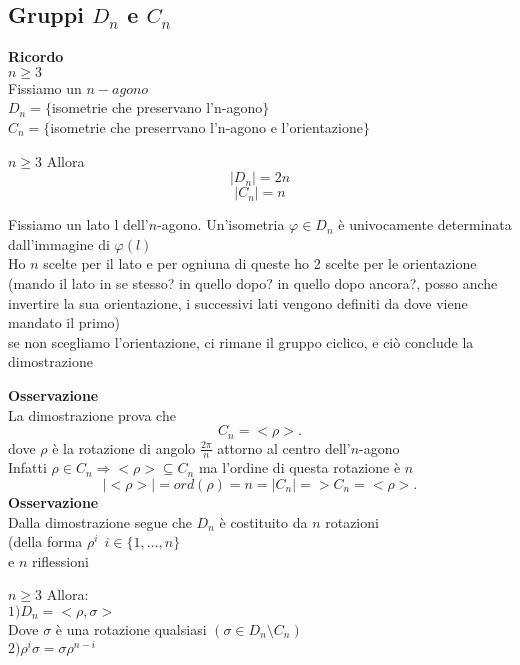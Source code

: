 \documentclass[12px]{article}
\begin{document}
{ \subsection{Gruppi $D_n$ e $C_n$}
  \textbf{Ricordo}\\
  $n\geq 3$\\
  Fissiamo un  $n-agono$ \\
  $D_n = \lbrace$isometrie che preservano l'n-agono$\rbrace$\\
   $C_n  = \lbrace$isometrie che preserrvano l'n-agono e l'orientazione$\rbrace$\\
 \begin{teo}
 	$n\geq 3$ Allora\\
	\[|D_n| = 2n\]
\[|C_n| = n\]
 \end{teo}
 \begin{dimo}
	 Fissiamo un lato l dell'$n$-agono. Un'isometria $ \varphi\in D_n$ è univocamente determinata dall'immagine di $ \varphi(l)$\\
	 Ho $n$ scelte per il lato e per ogniuna di queste ho 2 scelte per le orientazione (mando il lato in se stesso? in quello dopo? in quello dopo ancora?, posso anche invertire la sua orientazione, i successivi lati vengono definiti da dove viene mandato il primo)\\
	 se non scegliamo l'orientazione, ci rimane il gruppo ciclico, e ciò conclude la dimostrazione
 \end{dimo}
 \textbf{Osservazione}\\
 La dimostrazione prova che
 \[
  C_n = <\rho>
 .\]
 dove $\rho$ è la rotazione di angolo $\frac {2\pi}{n}$ attorno al centro dell'$n$-agono\\
 Infatti $\rho\in C_n \Rightarrow <\rho>\subseteq C_n$ ma l'ordine di questa rotazione è $n$
  \[
 |<\rho>| = ord(\rho) = n = |C_n| => C_n = <\rho>
 .\] 
 \textbf{Osservazione}\\
 Dalla dimostrazione segue che $D_n$ è costituito da $n$ rotazioni \\(della forma $\rho^i \ \ i\in\lbrace 1,\ldots, n\rbrace$ \\
 e $n$ riflessioni\\
 \begin{prop}
 	$n\geq 3$ Allora:\\
	 $1)D_n = <\rho,\sigma >$\\
	 Dove  $\sigma$ è una rotazione qualsiasi  $(\sigma \in D_n\setminus C_n)$ \\
	 $2)\rho^i \sigma = \sigma \rho^{n-i}$ 
 \end{prop}
}
\end{document}
